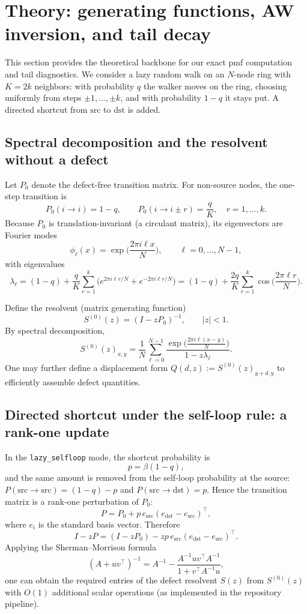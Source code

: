 \section{Theory: generating functions, AW inversion, and tail decay}

This section provides the theoretical backbone for our exact pmf computation and tail diagnostics.
We consider a lazy random walk on an $N$-node ring with $K=2k$ neighbors: with probability $q$ the walker moves on the ring, choosing uniformly from steps $\pm 1,\dots,\pm k$, and with probability $1-q$ it stays put. A directed shortcut from $\mathrm{src}$ to $\mathrm{dst}$ is added.

\subsection{Spectral decomposition and the resolvent without a defect}
Let $P_0$ denote the defect-free transition matrix. For non-source nodes, the one-step transition is
\[
P_0(i\to i)=1-q,\qquad
P_0(i\to i\pm r)=\frac{q}{K},\quad r=1,\dots,k.
\]
Because $P_0$ is translation-invariant (a circulant matrix), its eigenvectors are Fourier modes
\[
\phi_\ell(x)=\exp\Big(\frac{2\pi i\ell x}{N}\Big),\qquad \ell=0,\dots,N-1,
\]
with eigenvalues
\begin{equation}
\lambda_\ell
=(1-q)+\frac{q}{K}\sum_{r=1}^{k}\Big(e^{2\pi i\ell r/N}+e^{-2\pi i\ell r/N}\Big)
=(1-q)+\frac{2q}{K}\sum_{r=1}^{k}\cos\Big(\frac{2\pi \ell r}{N}\Big).
\end{equation}

Define the resolvent (matrix generating function)
\[
S^{(0)}(z)=(I-zP_0)^{-1},\qquad |z|<1.
\]
By spectral decomposition,
\begin{equation}
S^{(0)}(z)_{x,y}
=\frac{1}{N}\sum_{\ell=0}^{N-1}
\frac{\exp\Big(\frac{2\pi i\ell(x-y)}{N}\Big)}{1-z\lambda_\ell}.
\end{equation}
One may further define a displacement form $Q(d,z):=S^{(0)}(z)_{y+d,y}$ to efficiently assemble defect quantities.

\subsection{Directed shortcut under the self-loop rule: a rank-one update}
In the \texttt{lazy\_selfloop} mode, the shortcut probability is
\[
p=\beta(1-q),
\]
and the same amount is removed from the self-loop probability at the source: $P(\mathrm{src}\to\mathrm{src})=(1-q)-p$ and $P(\mathrm{src}\to\mathrm{dst})=p$.
Hence the transition matrix is a rank-one perturbation of $P_0$:
\begin{equation}
P = P_0 + p\, e_{\mathrm{src}}(e_{\mathrm{dst}}-e_{\mathrm{src}})^\top,
\end{equation}
where $e_i$ is the standard basis vector. Therefore
\[
I-zP = (I-zP_0) - z p\, e_{\mathrm{src}}(e_{\mathrm{dst}}-e_{\mathrm{src}})^\top.
\]
Applying the Sherman--Morrison formula
\[
(A+uv^\top)^{-1}=A^{-1}-\frac{A^{-1}uv^\top A^{-1}}{1+v^\top A^{-1}u},
\]
one can obtain the required entries of the defect resolvent $S(z)$ from $S^{(0)}(z)$ with $O(1)$ additional scalar operations (as implemented in the repository pipeline).

